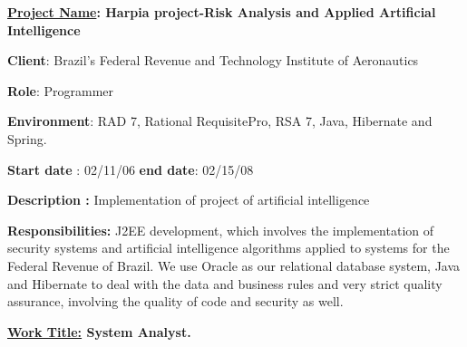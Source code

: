 \begin{itemize}
\vspace{\baselineskip}
\begin{justify}
\item {\fontsize{10pt}{12.0pt}\selectfont \textbf{\uline{Project Name}: Harpia project-Risk Analysis and Applied Artificial Intelligence}\par}
\end{justify}\par

{\fontsize{10pt}{12.0pt}\selectfont \textbf{Client}\tab \tab : Brazil's Federal Revenue and Technology Institute of Aeronautics\par}\par

{\fontsize{10pt}{12.0pt}\selectfont \textbf{Role}\tab \tab : Programmer\par}\par

\begin{justify}
{\fontsize{10pt}{12.0pt}\selectfont \textbf{Environment}: RAD 7, Rational RequisitePro, RSA 7, Java, Hibernate and Spring.\par}
\end{justify}\par

{\fontsize{10pt}{12.0pt}\selectfont \textbf{Start date} \tab : 02/11/06 \textbf{end date}: 02/15/08\par}\par

\begin{justify}
{\fontsize{10pt}{12.0pt}\selectfont \textbf{Description \tab : }Implementation of project of artificial intelligence\par}
\end{justify}\par

{\fontsize{10pt}{12.0pt}\selectfont \textbf{Responsibilities: } J2EE development, which involves the implementation of security systems and artificial intelligence algorithms applied to systems for the Federal Revenue of Brazil. We use Oracle as our relational database system, Java and Hibernate to deal with the data and business rules and very strict quality assurance, involving the quality of code and security as well.\par}\par


\vspace{\baselineskip}
\begin{justify}
\item {\fontsize{10pt}{12.0pt}\selectfont \textbf{\uline{Work Title:} \tab System Analyst.}\par}
\end{justify}\par


\end{itemize}
